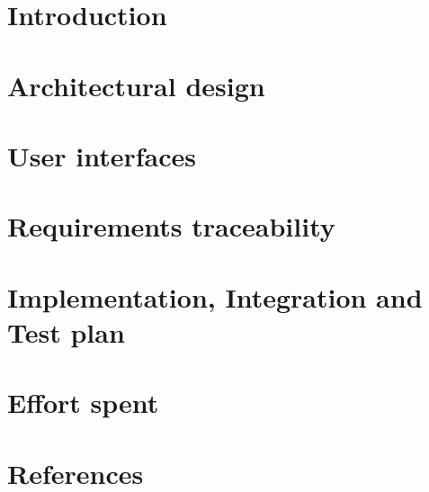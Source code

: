 \documentclass{TitlePage/Configuration_Files/PoliMi3i_thesis}
\begin{document}
\pagestyle{empty}


\tableofcontents{}
\clearpage
\pagestyle{fancy}
\setcounter{page}{1} %


\section{Introduction}


\section{Architectural design}


\section{User interfaces}


\section{Requirements traceability}


\section{Implementation, Integration and Test plan}


\section{Effort spent}


\section{References}

\end{document}
